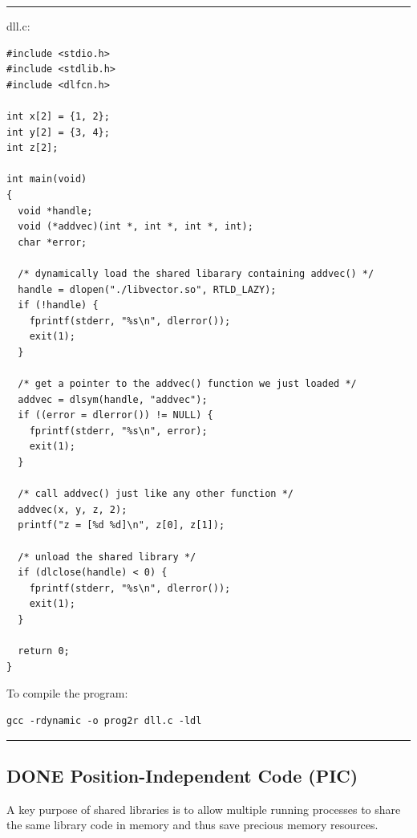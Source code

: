 \documentclass[11pt]{article}
\begin{document}
\noindent\rule{\textwidth}{0.5pt}
dll.c:\\
\begin{verbatim}
#include <stdio.h>
#include <stdlib.h>
#include <dlfcn.h>

int x[2] = {1, 2};
int y[2] = {3, 4};
int z[2];

int main(void)
{
  void *handle;
  void (*addvec)(int *, int *, int *, int);
  char *error;

  /* dynamically load the shared libarary containing addvec() */
  handle = dlopen("./libvector.so", RTLD_LAZY);
  if (!handle) {
    fprintf(stderr, "%s\n", dlerror());
    exit(1);
  }

  /* get a pointer to the addvec() function we just loaded */
  addvec = dlsym(handle, "addvec");
  if ((error = dlerror()) != NULL) {
    fprintf(stderr, "%s\n", error);
    exit(1);
  }

  /* call addvec() just like any other function */
  addvec(x, y, z, 2);
  printf("z = [%d %d]\n", z[0], z[1]);

  /* unload the shared library */
  if (dlclose(handle) < 0) {
    fprintf(stderr, "%s\n", dlerror());
    exit(1);
  }

  return 0;
}
\end{verbatim}

To compile the program:\\
\begin{verbatim}
gcc -rdynamic -o prog2r dll.c -ldl
\end{verbatim}

\noindent\rule{\textwidth}{0.5pt}

\subsection{{\bfseries\sffamily DONE} Position-Independent Code (PIC)}
\label{sec:org1c23e67}
A key purpose of shared libraries is to allow multiple running processes to share the same library code in memory and thus save precious memory resources.\\
\end{document}
